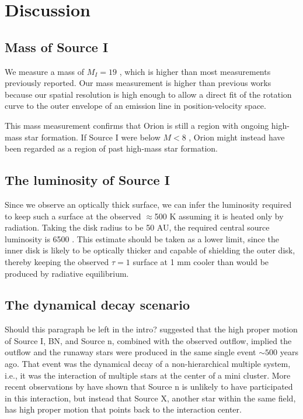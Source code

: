 \documentclass[twocolumn]{aastex61}
\begin{document}
\section{Discussion}
\subsection{Mass of Source I}
We measure a mass of $M_I=19$ \msun, which is higher than most measurements
previously reported.  Our mass measurement is higher than previous works
because our spatial resolution is high enough to allow a direct fit of the
rotation curve to the outer envelope of an emission line in position-velocity
space.

This mass measurement confirms that Orion is still a region with ongoing
high-mass star formation.  If Source I were below $M<8$ \msun, Orion might
instead have been regarded as a region of past high-mass star formation.

\subsection{The luminosity of Source I}
Since we observe an optically thick surface, we can infer the luminosity
required to keep such a surface at the observed $\approx$500 K assuming
it is heated only by radiation.  Taking the disk radius to be 50 AU,
the required central source luminosity is 6500 \lsun.  This estimate
should be taken as a lower limit, since the inner disk is likely to be
optically thicker and capable of shielding the outer disk, thereby
keeping the observed $\tau=1$ surface at 1 mm cooler than would
be produced by radiative equilibrium.

\subsection{The dynamical decay scenario}
{\color{red} Should this paragraph be left in the intro?}
\citet[][and earlier authors?]{Bally2011a} suggested that the high proper
motion of Source I, BN, and Source n, combined with the observed \hh outflow,
implied the outflow and the runaway stars were produced in the same single
event $\sim500$ years ago.  That event was the dynamical decay of a
non-hierarchical multiple system, i.e., it was the interaction of multiple
stars at the center of a mini cluster.  More recent observations by
\citet{Luhman2017a} have shown that Source n is unlikely to have participated
in this interaction, but instead that Source X, another star within the same
field, has high proper motion that points back to the interaction center.
\end{document}
